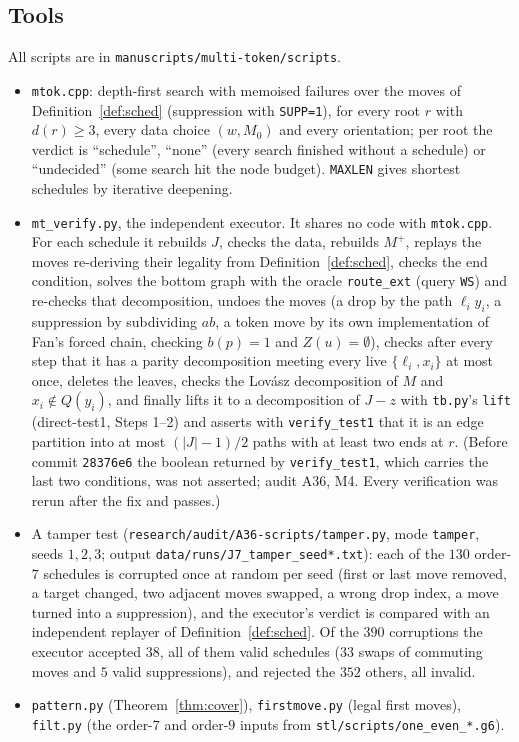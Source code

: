 \documentclass[11pt]{amsart}
\theoremstyle{definition}
\begin{document}
\subsection*{Tools} All scripts are in \texttt{manuscripts/multi-token/scripts}.
\begin{itemize}
\item \texttt{mtok.cpp}: depth-first search with memoised failures over the moves of
Definition~\ref{def:sched} (suppression with \texttt{SUPP=1}), for every root $r$ with $d(r)\ge3$,
every data choice $(w,M_0)$ and every orientation; per root the verdict is ``schedule'',
``none'' (every search finished without a schedule) or ``undecided'' (some search hit the node
budget). \texttt{MAXLEN} gives shortest schedules by iterative deepening.
\item \texttt{mt\_verify.py}, the independent executor. It shares no code with \texttt{mtok.cpp}.
For each schedule it rebuilds $J$, checks the data, rebuilds $M^+$, replays the moves re-deriving
their legality from Definition~\ref{def:sched}, checks the end condition, solves the bottom graph
with the oracle \texttt{route\_ext} (query \texttt{WS}) and re-checks that decomposition, undoes
the moves (a drop by the path $\ell_iy_i$, a suppression by subdividing $ab$, a token move by its
own implementation of Fan's forced chain, checking $b(p)=1$ and $Z(u)=\emptyset$), checks after every
step that it has a parity decomposition meeting every live $\{\ell_i,x_i\}$ at most once, deletes the
leaves, checks the Lov\'asz decomposition of $M$ and $x_i\notin Q(y_i)$, and finally lifts it to a
decomposition of $J-z$ with \texttt{tb.py}'s \texttt{lift} (direct-test1, Steps 1--2) and asserts
with \texttt{verify\_test1} that it is an edge partition into at most $(|J|-1)/2$ paths with at least
two ends at $r$. (Before commit \texttt{28376e6} the boolean returned by \texttt{verify\_test1}, which
carries the last two conditions, was not asserted; audit A36, M4. Every verification was rerun after
the fix and passes.)
\item A tamper test (\texttt{research/audit/A36-scripts/tamper.py}, mode \texttt{tamper}, seeds
$1,2,3$; output \texttt{data/runs/J7\_tamper\_seed*.txt}): each of the $130$ order-$7$ schedules is
corrupted once at random per seed (first or last move removed, a target changed, two adjacent moves
swapped, a wrong drop index, a move turned into a suppression), and the executor's verdict is compared
with an independent replayer of Definition~\ref{def:sched}. Of the $390$ corruptions the executor
accepted $38$, all of them valid schedules ($33$ swaps of commuting moves and $5$ valid suppressions),
and rejected the $352$ others, all invalid.
\item \texttt{pattern.py} (Theorem~\ref{thm:cover}), \texttt{firstmove.py} (legal first moves),
\texttt{filt.py} (the order-$7$ and order-$9$ inputs from \texttt{stl/scripts/one\_even\_*.g6}).
\end{itemize}
\end{document}
